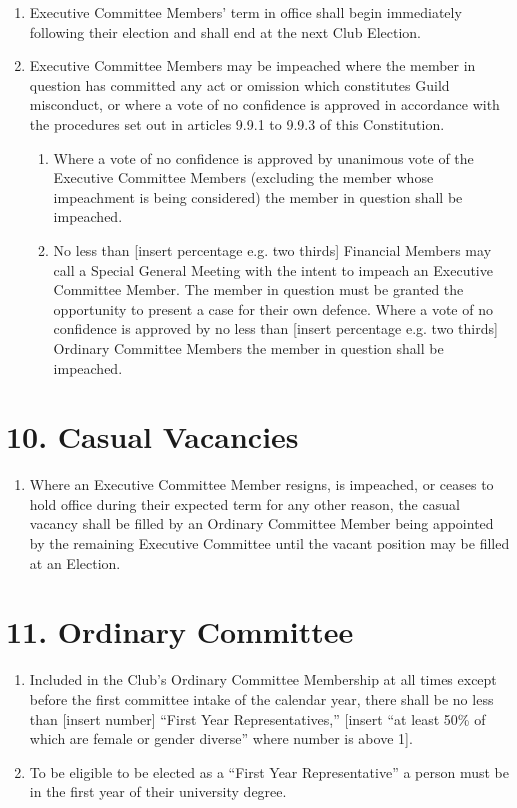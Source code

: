 \documentclass[12pt]{article}
\begin{document}
\begin{enumerate}[label=9.\arabic*]
\begin{enumerate}[label=\theenumi.\arabic*]
    \end{enumerate}
\item Executive Committee Members' term in office shall begin immediately following their election and shall end at the next Club Election.
\item Executive Committee Members may be impeached where the member in question has committed any act or omission which constitutes Guild misconduct, or where a vote of no confidence is approved in accordance with the procedures set out in articles 9.9.1 to 9.9.3 of this Constitution.
    \begin{enumerate}[label=\theenumi.\arabic*]
        \item Where a vote of no confidence is approved by unanimous vote of the Executive Committee Members (excluding the member whose impeachment is being considered) the member in question shall be impeached.
        \item No less than [insert percentage e.g. two thirds] Financial Members may call a Special General Meeting with the intent to impeach an Executive Committee Member. The member in question must be granted the opportunity to present a case for their own defence. Where a vote of no confidence is approved by no less than [insert percentage e.g. two thirds] Ordinary Committee Members the member in question shall be impeached.
    \end{enumerate}
\end{enumerate}

\section{10. Casual Vacancies}
\begin{enumerate}[label=10.\arabic*]
 \item Where an Executive Committee Member resigns, is impeached, or ceases to hold office during their expected term for any other reason, the casual vacancy shall be filled by an Ordinary Committee Member being appointed by the remaining Executive Committee until the vacant position may be filled at an Election. 
\end{enumerate}
%
\section{11. Ordinary Committee}
\begin{enumerate}[label=11.\arabic*]
\item Included in the Club's Ordinary Committee Membership at all times except before the first committee intake of the calendar year, there shall be no less than [insert number] ``First Year Representatives,'' [insert ``at least 50\% of which are female or gender diverse'' where number is above 1].
 \item To be eligible to be elected as a ``First Year Representative'' a person must be in the first year of their university degree.
\end{enumerate}
\end{document}
